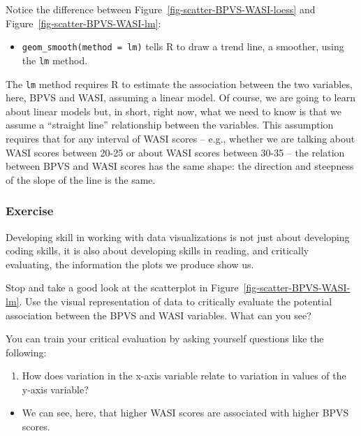 \documentclass[
  letterpaper,
  DIV=11,
  numbers=noendperiod]{scrreprt}
\providecommand{\tightlist}{%
  \setlength{\itemsep}{0pt}\setlength{\parskip}{0pt}}\usepackage{longtable,booktabs,array}
\begin{document}
Notice the difference between Figure~\ref{fig-scatter-BPVS-WASI-loess}
and Figure~\ref{fig-scatter-BPVS-WASI-lm}:

\begin{itemize}
\tightlist
\item
  \texttt{geom\_smooth(method\ =\ \textquotesingle{}lm\textquotesingle{})}
  tells R to draw a trend line, a smoother, using the \texttt{lm}
  method.
\end{itemize}

The \texttt{lm} method requires R to estimate the association between
the two variables, here, BPVS and WASI, assuming a linear model. Of
course, we are going to learn about linear models but, in short, right
now, what we need to know is that we assume a ``straight line''
relationship between the variables. This assumption requires that for
any interval of WASI scores -- e.g., whether we are talking about WASI
scores between 20-25 or about WASI scores between 30-35 -- the relation
between BPVS and WASI scores has the same shape: the direction and
steepness of the slope of the line is the same.

\hypertarget{exercise-3}{%
\subsubsection{Exercise}\label{exercise-3}}

Developing skill in working with data visualizations is not just about
developing coding skills, it is also about developing skills in reading,
and critically evaluating, the information the plots we produce show us.

Stop and take a good look at the scatterplot in
Figure~\ref{fig-scatter-BPVS-WASI-lm}. Use the visual representation of
data to critically evaluate the potential association between the BPVS
and WASI variables. What can you see?

You can train your critical evaluation by asking yourself questions like
the following:

\begin{enumerate}
\def\labelenumi{\arabic{enumi}.}
\tightlist
\item
  How does variation in the x-axis variable relate to variation in
  values of the y-axis variable?
\end{enumerate}

\begin{itemize}
\tightlist
\item
  We can see, here, that higher WASI scores are associated with higher
  BPVS scores.
\end{itemize}
\end{document}
